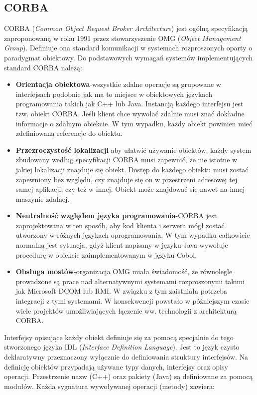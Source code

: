 \subsection{CORBA}
CORBA (\textit{Common Object Request Broker Architecture}) jest ogólną specyfikacją zaproponowaną w roku 1991 przez stowarzyszenie OMG (\textit{Object Management Group}). Definiuje ona standard komunikacji w systemach rozproszonych oparty o paradygmat obiektowy. Do podstawowych wymagań\cite{bolton2002pure} systemów implementujących standard CORBA należą:
\begin{itemize}
	\item \textbf{Orientacja obiektowa}-wszystkie zdalne operacje są grupowane w interfejsach podobnie jak ma to miejsce w obiektowych językach programowania takich jak C++ lub Java. Instancją każdego interfejsu jest tzw. obiekt CORBA\@. Jeśli klient chce wywołać zdalnie musi znać dokładne informacje o zdalnym obiekcie. W tym wypadku, każdy obiekt powinien mieć zdefiniowaną referencje do obiektu.
	\item \textbf{Przezroczystość lokalizacji}-aby ułatwić używanie obiektów, każdy system zbudowany według specyfikacji CORBA musi zapewnić, że nie istotne w jakiej lokalizacji znajduje się obiekt. Dostęp do każdego obiektu musi zostać zapewniony bez względu, czy znajduje się on w przestrzeni adresowej tej samej aplikacji, czy też w innej. Obiekt może znajdować się nawet na innej maszynie zdalnej.
	\item \textbf{Neutralność względem języka programowania}-CORBA jest zaprojektowana w ten sposób, aby kod klienta i serwera mógł zostać utworzony w różnych językach oprogramowania. W tym wypadku całkowicie normalną jest sytuacja, gdyż klient napisany w języku Java wywołuje procedurę w obiekcie zaimplementowanym w języku Cobol.
	\item \textbf{Obsługa mostów}-organizacja OMG miała świadomość, że równolegle prowadzone są prace nad alternatywnymi systemami rozproszonymi takimi jak Microsoft DCOM lub RMI\@. W związku z tym zaistniała potrzeba integracji z tymi systemami. W konsekwencji powstało w późniejszym czasie wiele projektów umożliwiających łączenie ww. technologii z architekturą CORBA\@.
\end{itemize}
Interfejsy opisujące każdy obiekt definiuje się za pomocą specjalnie do tego stworzonego języka IDL (\textit{Interface Definition Language}). Jest to język czysto deklaratywny przeznaczony wyłącznie do definiowania struktury interfejsów. Na definicję obiektów przypadają używane typy danych, interfejsy oraz opisy operacji. Przestrzenie nazw (C++) oraz pakiety (Java) są definiowane za pomocą modułów. Każda sygnatura wywoływanej operacji (metody) zawiera:
